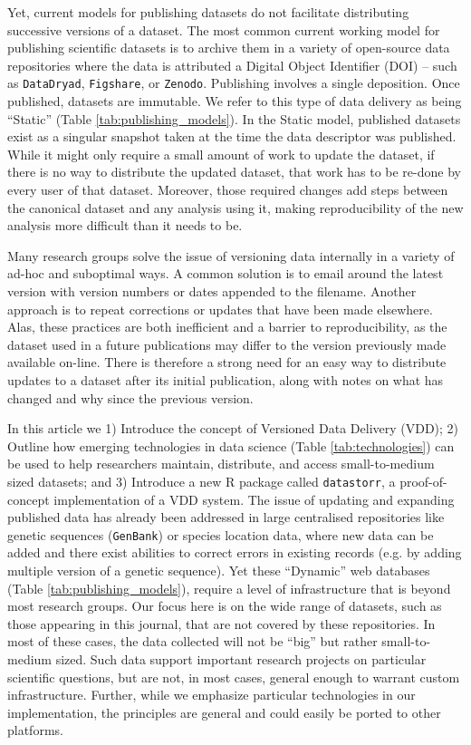 \documentclass[a4paper,num-refs]{assets/oup-contemporary}
\begin{document}
Yet, current models for publishing datasets do not facilitate distributing successive versions of a dataset. The most common current working model for publishing scientific datasets is to archive them in a variety of open-source data repositories where the data is attributed a Digital Object Identifier (DOI) -- such as \texttt{DataDryad}, \texttt{Figshare}, or \texttt{Zenodo}. Publishing involves a single deposition. Once published, datasets are immutable.  We refer to this type of data delivery as being ``Static'' (Table \ref{tab:publishing_models}). In the Static model, published datasets exist as a singular snapshot taken at the time the data descriptor was published. While it might only require a small amount of work to update the dataset, if there is no way to distribute the updated dataset, that work has to be re-done by every user of that dataset. Moreover, those required changes add steps between the canonical dataset and any analysis using it, making reproducibility of the new analysis more difficult than it needs to be.

Many research groups solve the issue of versioning data internally in a variety of ad-hoc and suboptimal ways. A common solution is to email around the latest version with version numbers or dates appended to the filename. Another approach is to repeat corrections or updates that have been made elsewhere. Alas, these practices are both inefficient and a barrier to reproducibility, as the dataset used in a future publications may differ to the version previously made available on-line. There is therefore a strong need for an easy way to distribute updates to a dataset after its initial publication, along with notes on what has changed and why since the previous version.

In this article we 1) Introduce the concept of Versioned Data Delivery (VDD); 2) Outline how emerging technologies in data science (Table \ref{tab:technologies}) can be used to help researchers maintain, distribute, and access small-to-medium sized datasets; and 3) Introduce a new \textsc{R} package called \texttt{datastorr}, a proof-of-concept implementation of a VDD system. The issue of updating and expanding published data has already been addressed in large centralised repositories like genetic sequences (\texttt{GenBank}) or species location data, where new data can be added and there exist abilities to correct errors in existing records (e.g. by adding multiple version of a genetic sequence). Yet these ``Dynamic'' web databases (Table \ref{tab:publishing_models}), require a level of infrastructure that is beyond most research groups. Our focus here is on the wide range of datasets, such as those appearing in this journal, that are not covered by these repositories. In most of these cases, the data collected will not be ``big'' but rather small-to-medium sized. Such data support important research projects on particular scientific questions, but are not, in most cases, general enough to warrant custom infrastructure. Further, while we emphasize particular technologies in our implementation, the principles are general and could easily be ported to other platforms.
\end{document}
